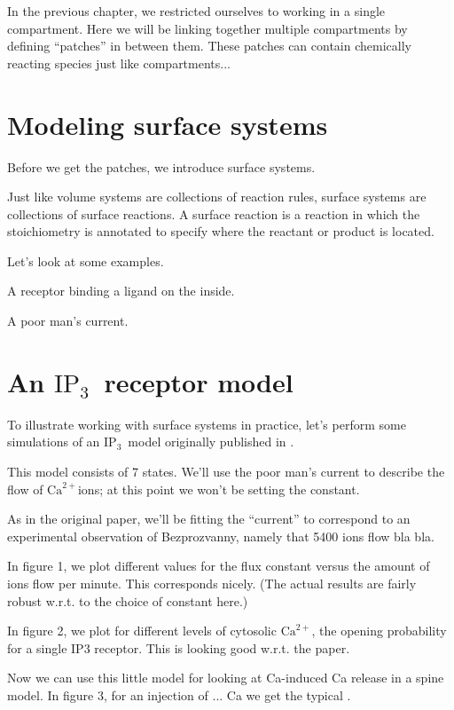 \documentclass[a4paper,12pt]{book}
\newcommand{\catpl}[0]{\ensuremath{\textrm{Ca}^{2+}}}
\newcommand{\inspt}[0]{\ensuremath{\textrm{IP}_3}}
\begin{document}
In the previous chapter, we restricted ourselves to working in a single compartment. Here we will be linking together multiple compartments by defining ``patches'' in between them. These patches can contain chemically reacting species just like compartments...

\section{Modeling surface systems}

Before we get the patches, we introduce surface systems.

Just like volume systems are collections of reaction rules, surface systems are collections of surface reactions. A surface reaction is a reaction in which the stoichiometry is annotated to specify where the reactant or product is located.

Let's look at some examples. 

A receptor binding a ligand on the inside.

A poor man's current.

\section{An \inspt\ receptor model}

To illustrate working with surface systems in practice, let's perform some simulations of an \inspt\ model originally published in \cite{Doi:JNeurosci:2005}. 

This model consists of 7 states. We'll use the poor man's current to describe the flow of \catpl ions; at this point we won't be setting the constant.

As in the original paper, we'll be fitting the ``current'' to correspond to an experimental observation of Bezprozvanny, namely that 5400 ions flow bla bla.

In figure 1, we plot different values for the flux constant versus the amount of ions flow per minute. This corresponds nicely. (The actual results are fairly robust w.r.t. to the choice of constant here.)

In figure 2, we plot for different levels of cytosolic \catpl, the opening probability for a single IP3 receptor. This is looking good w.r.t. the paper.

Now we can use this little model for looking at Ca-induced Ca release in a spine model. In figure 3, for an injection of ... Ca we get the typical .

\end{document}
